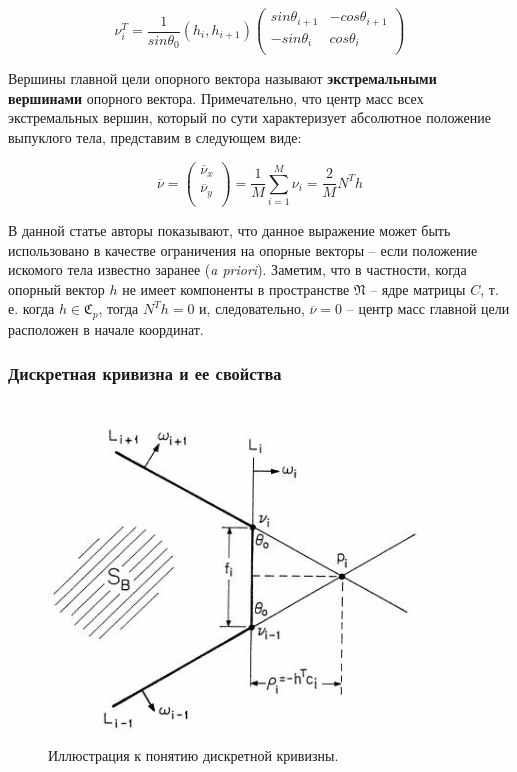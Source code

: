 \documentclass[a4paper, 12pt, titlepage]{article}
\theoremstyle{definition}
\theoremstyle{plain}
\theoremstyle{plain}
\begin{document}
\begin{equation}
\nu_{i}^{T} = \frac{1}{sin \theta_{0}} (h_{i},  h_{i + 1})
\left(
  \begin{array}{cc}
    sin \theta_{i + 1} & - cos \theta_{i + 1} \\
    - sin \theta_{i} & cos \theta_{i} \\
  \end{array}
\right)
\end{equation}

Вершины главной цели опорного вектора называют \textbf{экстремальными вершинами}
опорного вектора. Примечательно, что центр масс всех экстремальных вершин,
который по сути характеризует абсолютное положение выпуклого тела, представим
в следующем виде:

\begin{equation}
\overline{\nu} = \left(
  \begin{array}{c}
   \overline{\nu}_{x} \\
   \overline{\nu}_{y} \\
  \end{array}
  \right) =
  \frac{1}{M} \sum\limits_{i = 1}^{M} \nu_{i} = \frac{2}{M} N^{T} h
\end{equation}

В данной статье авторы показывают, что данное выражение может быть использовано
в качестве ограничения на опорные векторы -- если положение искомого тела
известно заранее (\textit{a priori}). Заметим, что в частности, когда опорный
вектор $h$ не имеет компоненты в пространстве $\mathfrak{N}$ -- ядре матрицы
$C$, т. е. когда $h \in \mathfrak{C}_{p}$, тогда $N^{T} h = 0$ и, следовательно,
$\overline{\nu} = 0$ -- центр масс главной цели расположен в начале координат.

\subsubsection{Дискретная кривизна и ее свойства}
\label{sec:support-methods:2d-uniform:discrete-curvature}

\begin{figure}[ht]
    \includegraphics[width=10cm]{images/dicrete-radius-curvature.jpg}
    \caption{Иллюстрация к понятию дискретной кривизны.}
    \label{dicrete-radius-curvature}
\end{figure}
\end{document}
